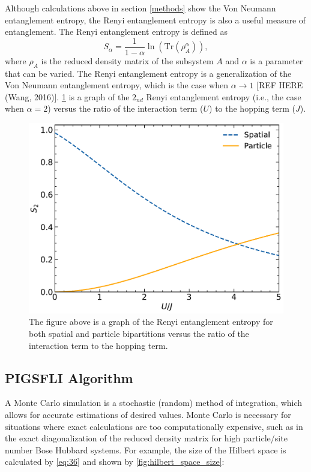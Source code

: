 Although calculations above in section \ref{methods} show the Von Neumann entanglement entropy, the Renyi entanglement entropy is also a useful measure of entanglement. The Renyi entanglement entropy is defined as 
\begin{equation}
S_{\alpha} = \frac{1}{1-\alpha} \ln{\left( \text{Tr} \left( \rho_A^{\alpha} \right) \right)},
\end{equation}
where $\rho_A$ is the reduced density matrix of the subsystem $A$ and $\alpha$ is a parameter that can be varied. The Renyi entanglement entropy is a generalization of the Von Neumann entanglement entropy, which is the case when $\alpha \rightarrow 1$ [REF HERE (Wang, 2016)]. \cref*{fig:ed_renyi} is a graph of the $2_{nd}$ Renyi entanglement entropy (i.e., the case when $\alpha = 2$) versus the ratio of the interaction term ($U$) to the hopping term ($J$).

\begin{figure}[H]
\centering
\includegraphics[scale=0.5]{../figures/ed_renyi.pdf}
\caption{The figure above is a graph of the Renyi entanglement entropy for both spatial and particle bipartitions versus the ratio of the interaction term to the hopping term.}
\label{fig:ed_renyi}
\end{figure}

\subsection{PIGSFLI Algorithm} \label{PIGSFLI}

A Monte Carlo simulation is a stochastic (random) method of integration, which allows for accurate estimations of desired values. Monte Carlo is necessary for situations where exact calculations are too computationally expensive, such as in the exact diagonalization of the reduced density matrix for high particle/site number Bose Hubbard systems. For example, the size of the Hilbert space is calculated by \cref{eq:36} and shown by \cref{fig:hilbert_space_size}:

